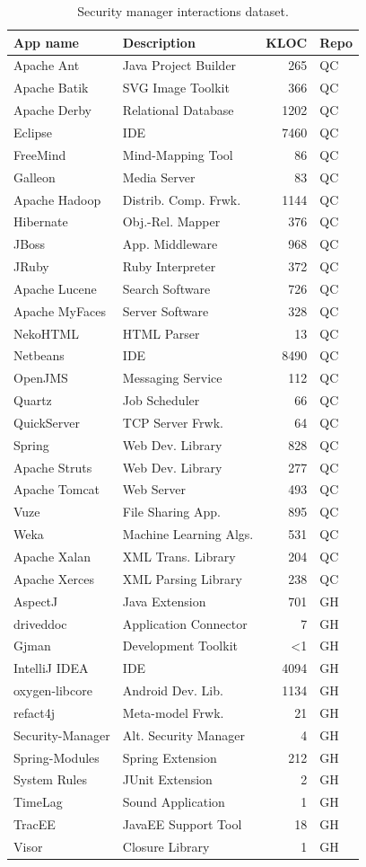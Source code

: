 \documentclass{sig-alternate}
\begin{document}
\begin{table}
\small
\caption{Security manager interactions
  dataset.\label{Table:applications-studied}}
\begin{tabular}{llrl}
\toprule 
App name & Description & KLOC & Repo\tabularnewline
\midrule
Apache Ant & Java Project Builder & 265 & QC\tabularnewline
Apache Batik & SVG Image Toolkit & 366 & QC\tabularnewline
Apache Derby & Relational Database & 1202 & QC\tabularnewline
Eclipse  & IDE & 7460 & QC\tabularnewline
FreeMind & Mind-Mapping Tool & 86 & QC\tabularnewline
Galleon & Media Server & 83 & QC\tabularnewline
Apache Hadoop & Distrib. Comp. Frwk. & 1144 & QC\tabularnewline
Hibernate & Obj.-Rel. Mapper & 376 & QC\tabularnewline
JBoss & App. Middleware & 968 & QC\tabularnewline
JRuby & Ruby Interpreter & 372 & QC\tabularnewline
Apache Lucene & Search Software & 726 & QC\tabularnewline
Apache MyFaces & Server Software & 328 & QC\tabularnewline
NekoHTML & HTML Parser & 13 & QC\tabularnewline
Netbeans & IDE & 8490 & QC\tabularnewline
OpenJMS & Messaging Service & 112 & QC\tabularnewline
Quartz  & Job Scheduler & 66 & QC\tabularnewline
QuickServer & TCP Server Frwk. & 64 & QC\tabularnewline
Spring & Web Dev. Library & 828 & QC\tabularnewline
Apache Struts & Web Dev. Library & 277 & QC\tabularnewline
Apache Tomcat & Web Server & 493 & QC\tabularnewline
Vuze & File Sharing App. & 895 & QC\tabularnewline
Weka & Machine Learning Algs. & 531 & QC\tabularnewline
Apache Xalan & XML Trans. Library & 204 & QC\tabularnewline
Apache Xerces & XML Parsing Library & 238 & QC\tabularnewline
AspectJ & Java Extension & 701 & GH\tabularnewline
driveddoc & Application Connector & 7 & GH\tabularnewline
Gjman & Development Toolkit & <1 & GH\tabularnewline
IntelliJ IDEA & IDE & 4094 & GH\tabularnewline
oxygen-libcore & Android Dev. Lib. & 1134 & GH\tabularnewline
refact4j & Meta-model Frwk. & 21 & GH\tabularnewline
Security-Manager & Alt. Security Manager & 4 & GH\tabularnewline
Spring-Modules & Spring Extension & 212 & GH\tabularnewline
System Rules & JUnit Extension & 2 & GH\tabularnewline
TimeLag & Sound Application & 1 & GH\tabularnewline
TracEE & JavaEE Support Tool & 18 & GH\tabularnewline
Visor & Closure Library & 1 & GH\tabularnewline
\bottomrule
\end{tabular}
\end{table}
\end{document}
